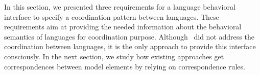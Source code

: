 {%

In this section, we presented three requirements for a language behavioral interface to specify a coordination pattern between languages. These requirements aim at providing the needed information about the behavioral semantics of languages for coordination purpose. Although~\cite{sle13-combemale} did not address the coordination between languages, it is the only approach to provide this interface consciously. In the next section, we study how existing approaches get correspondences between model elements by relying on correspondence rules.

	    	
	    	
	    				
	    				
	    				
	    				
}
